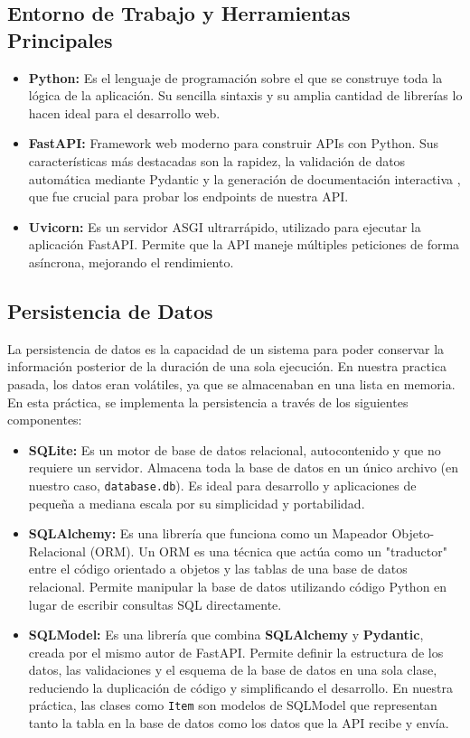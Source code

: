 \documentclass[12pt]{article}
\begin{document}
\subsection*{Entorno de Trabajo y Herramientas Principales}
\begin{itemize}
    \item \textbf{Python:} Es el lenguaje de programación sobre el que se construye toda la lógica de la aplicación. Su sencilla sintaxis y su amplia cantidad de librerías lo hacen ideal para el desarrollo web.\cite{ref2}
    \item \textbf{FastAPI:} Framework web moderno para construir APIs con Python. Sus características más destacadas son la rapidez, la validación de datos automática mediante Pydantic y la generación de documentación interactiva , que fue crucial para probar los endpoints de nuestra API.
    \item \textbf{Uvicorn:} Es un servidor ASGI ultrarrápido, utilizado para ejecutar la aplicación FastAPI. Permite que la API maneje múltiples peticiones de forma asíncrona, mejorando el rendimiento.\cite{ref3}
\end{itemize}

\subsection*{Persistencia de Datos}
La persistencia de datos es la capacidad de un sistema para poder conservar la información posterior de la duración de una sola ejecución. En nuestra practica pasada, los datos eran volátiles, ya que se almacenaban en una lista en memoria. En esta práctica, se implementa la persistencia a través de los siguientes componentes:

\begin{itemize}
    \item \textbf{SQLite:} Es un motor de base de datos relacional, autocontenido y que no requiere un servidor. Almacena toda la base de datos en un único archivo (en nuestro caso, \texttt{database.db}). Es ideal para desarrollo y aplicaciones de pequeña a mediana escala por su simplicidad y portabilidad.
    
    \item \textbf{SQLAlchemy:} Es una librería que funciona como un Mapeador Objeto-Relacional (ORM). Un ORM es una técnica que actúa como un "traductor" entre el código orientado a objetos y las tablas de una base de datos relacional. Permite manipular la base de datos utilizando código Python en lugar de escribir consultas SQL directamente.
    
    \item \textbf{SQLModel:} Es una librería que combina \textbf{SQLAlchemy} y \textbf{Pydantic}, creada por el mismo autor de FastAPI. Permite definir la estructura de los datos, las validaciones y el esquema de la base de datos en una sola clase, reduciendo la duplicación de código y simplificando el desarrollo. En nuestra práctica, las clases como \texttt{Item} son modelos de SQLModel que representan tanto la tabla en la base de datos como los datos que la API recibe y envía.\cite{ref4}
\end{itemize}
\end{document}
